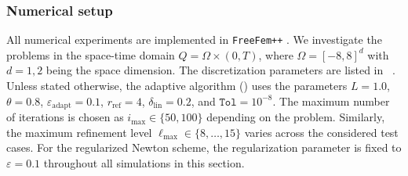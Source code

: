\documentclass[review,11pt]{article}
\numberwithin{equation}{section}
\begin{document}
\subsubsection{Numerical setup}\label{subsec:num-setup}
All numerical experiments are implemented in 
\texttt{FreeFem++} \cite{hecht2012new}.
We investigate the problems in the space-time domain $Q=\Omega\times(0,T)$, where $\Omega=[-8,8]^d$ with $d=1,2$ being the space dimension. The discretization parameters are listed in ~.
Unless stated otherwise, the adaptive algorithm () uses the parameters $L = 1.0$, $\theta = 0.8$, $\varepsilon_{\mathrm{adapt}} = 0.1$, $r_{\mathrm{ref}} = 4$, $\delta_{\mathrm{lin}} = 0.2$, and $\texttt{Tol}=10^{-8}$. The maximum number of iterations is chosen as $i_{\max}\in\{50,100\}$ depending on the problem. Similarly, the maximum refinement level $\ell_{\max}\in\{8,\ldots,15\}$ varies across the considered test cases. For the regularized Newton scheme, the regularization parameter is fixed to $\varepsilon = 0.1$ throughout all simulations in this section.



\end{document}
